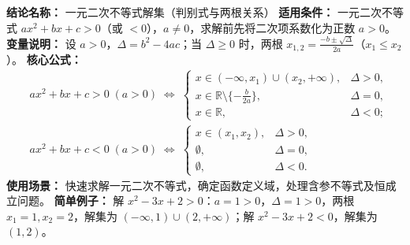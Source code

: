 \textbf{结论名称：} 一元二次不等式解集（判别式与两根关系）  
\textbf{适用条件：} 一元二次不等式 \(ax^2+bx+c>0\)（或 \(<0\)），\(a\neq0\)，求解前先将二次项系数化为正数 \(a>0\)。  
\textbf{变量说明：} 设 \(a>0\)，\(\Delta=b^2-4ac\)；当 \(\Delta\ge0\) 时，两根 \(x_{1,2}=\frac{-b\pm\sqrt{\Delta}}{2a}\)（\(x_1\le x_2\)）。  
\textbf{核心公式：}
\[
\boxed{
\begin{aligned}
&ax^2+bx+c>0\;(a>0)\;\Longleftrightarrow\;
\begin{cases}
x\in(-\infty,x_1)\cup(x_2,+\infty), & \Delta>0,\\[2pt]
x\in\mathbb{R}\setminus\{-\frac{b}{2a}\}, & \Delta=0,\\[2pt]
x\in\mathbb{R}, & \Delta<0;
\end{cases}\\
&ax^2+bx+c<0\;(a>0)\;\Longleftrightarrow\;
\begin{cases}
x\in(x_1,x_2), & \Delta>0,\\[2pt]
\emptyset, & \Delta=0,\\[2pt]
\emptyset, & \Delta<0.
\end{cases}
\end{aligned}
}
\]  
\textbf{使用场景：} 快速求解一元二次不等式，确定函数定义域，处理含参不等式及恒成立问题。  
\textbf{简单例子：} 解 \(x^2-3x+2>0\)：\(a=1>0\)，\(\Delta=1>0\)，两根 \(x_1=1,x_2=2\)，解集为 \((-\infty,1)\cup(2,+\infty)\)；解 \(x^2-3x+2<0\)，解集为 \((1,2)\)。
